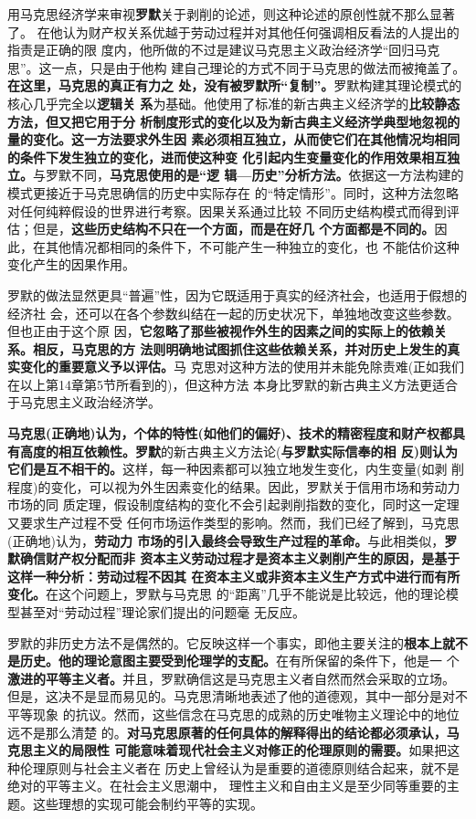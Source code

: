 用马克思经济学来审视\textbf{罗默}关于剥削的论述，则这种论述的原创性就不那么显著了。
在他认为财产权关系优越于劳动过程并对其他任何强调相反看法的人提出的指责是正确的限
度内，他所做的不过是建议马克思主义政治经济学“回归马克思”。这一点，只是由于他构
建自己理论的方式不同于马克思的做法而被掩盖了。\textbf{在这里，马克思的真正有力之
  处，没有被罗默所“复制”。}罗默构建其理论模式的核心几乎完全以\textbf{逻辑关
  系}为基础。他使用了标准的新古典主义经济学的\textbf{比较静态方法，但又把它用于分
  析制度形式的变化以及为新古典主义经济学典型地忽视的量的变化。这一方法要求外生因
  素必须相互独立，从而使它们在其他情况均相同的条件下发生独立的变化，进而使这种变
  化引起内生变量变化的作用效果相互独立。}与罗默不同，\textbf{马克思使用的是“逻
  辑—历史”分析方法。}依据这一方法构建的模式更接近于马克思确信的历史中实际存在
的“特定情形”。同时，这种方法忽略对任何纯粹假设的世界进行考察。因果关系通过比较
不同历史结构模式而得到评估；但是，\textbf{这些历史结构不只在一个方面，而是在好几
  个方面都是不同的。}因此，在其他情况都相同的条件下，不可能产生一种独立的变化，也
不能估价这种变化产生的因果作用。

罗默的做法显然更具“普遍”性，因为它既适用于真实的经济社会，也适用于假想的经济社
会，还可以在各个参数纠结在一起的历史状况下，单独地改变这些参数。但也正由于这个原
因，\textbf{它忽略了那些被视作外生的因素之间的实际上的依赖关系。相反，马克思的方
  法则明确地试图抓住这些依赖关系，并对历史上发生的真实变化的重要意义予以评估。}马
克思对这种方法的使用并未能免除责难(正如我们在以上第14章第5节所看到的)，但这种方法
本身比罗默的新古典主义方法更适合于马克思主义政治经济学。

\textbf{马克思(正确地)认为，个体的特性(如他们的偏好)、技术的精密程度和财产权都具
  有高度的相互依赖性。}\textbf{罗默}的新古典主义方法论(\textbf{与罗默实际信奉的相
  反)则认为它们是互不相干的。}这样，每一种因素都可以独立地发生变化，内生变量(如剥
削程度)的变化，可以视为外生因素变化的结果。因此，罗默关于信用市场和劳动力市场的同
质定理，假设制度结构的变化不会引起剥削指数的变化，同时这一定理又要求生产过程不受
任何市场运作类型的影响。然而，我们已经了解到，马克思(正确地)认为，\textbf{劳动力
  市场的引入最终会导致生产过程的革命。}与此相类似，\textbf{罗默确信财产权分配而非
  资本主义劳动过程才是资本主义剥削产生的原因，是基于这样一种分析：劳动过程不因其
  在资本主义或非资本主义生产方式中进行而有所变化。}在这个问题上，罗默与马克思
的“距离”几乎不能说是比较远，他的理论模型甚至对“劳动过程”理论家们提出的问题毫
无反应。

罗默的非历史方法不是偶然的。它反映这样一个事实，即他主要关注的\textbf{根本上就不
  是历史。他的理论意图主要受到伦理学的支配。}在有所保留的条件下，他是一
个\textbf{激进的平等主义者。}并且，罗默确信这是马克思主义者自然而然会采取的立场。
但是，这决不是显而易见的。马克思清晰地表述了他的道德观，其中一部分是对不平等现象
的抗议。然而，这些信念在马克思的成熟的历史唯物主义理论中的地位远不是那么清楚
的。\textbf{对马克思原著的任何具体的解释得出的结论都必须承认，马克思主义的局限性
  可能意味着现代社会主义对修正的伦理原则的需要。}如果把这种伦理原则与社会主义者在
历史上曾经认为是重要的道德原则结合起来，就不是绝对的平等主义。在社会主义思潮中，
理性主义和自由主义是至少同等重要的主题。这些理想的实现可能会制约平等的实现。

